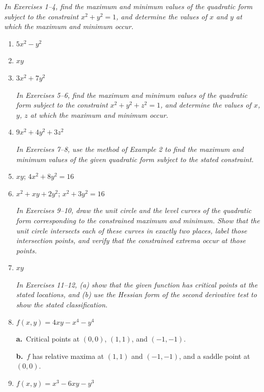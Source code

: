 \documentclass{article}
\begin{document}
\noindent\textit{In Exercises 1--4, find the maximum and minimum values of the quadratic
form subject to the constraint $x^2+y^2=1$, and determine the values of $x$ and $y$ at
which the maximum and minimum occur.}

\begin{enumerate}

\item $5x^2-y^2$

\item[2.] $xy$

\item[3.] $3x^2+7y^2$

\noindent\textit{In Exercises 5--6, find the maximum and minimum values of the quadratic
form subject to the constraint $x^2+y^2+z^2=1$, and determine the values of $x$, $y$, $z$
at which the maximum and minimum occur.}

\item[5.] $9x^2+4y^2+3z^2$

\noindent\textit{In Exercises 7--8, use the method of Example 2 to find the maximum and
minimum values of the given quadratic form subject to the stated constraint.}

\item[7.] $xy$; \; $4x^2+8y^2=16$

\item[8.] $x^2+xy+2y^2$; \; $x^2+3y^2=16$

\noindent\textit{In Exercises 9--10, draw the unit circle and the level curves of the
quadratic form corresponding to the constrained maximum and minimum. Show that the unit
circle intersects each of these curves in exactly two places, label those intersection
points, and verify that the constrained extrema occur at those points.}

\item[10.] $xy$

\noindent\textit{In Exercises 11--12, (a) show that the given function has critical points
at the stated locations, and (b) use the Hessian form of the second derivative test to
show the stated classification.}

\item[11.] $f(x,y)=4xy-x^4-y^4$

\textbf{a.}\ Critical points at $(0,0)$, $(1,1)$, and $(-1,-1)$.

\textbf{b.}\ $f$ has relative maxima at $(1,1)$ and $(-1,-1)$, and a saddle point at $(0,0)$.

\item[12.] $f(x,y)=x^3-6xy-y^3$


\end{enumerate}
\end{document}
